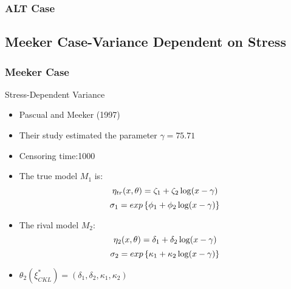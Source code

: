 \documentclass[xcolor=dvipsnames,aspectratio=1610]{beamer}
\begin{document}


\begin{frame}
\frametitle{ALT Case}

\begin{figure}
\end{figure}
\end{frame}



\subsection{Meeker Case-Variance Dependent on Stress}
\begin{frame}
\frametitle{Meeker Case}
Stress-Dependent Variance
\begin{itemize}
\item Pascual and Meeker (1997)

\item Their study estimated the parameter $\gamma=75.71$

\item Censoring time:1000

\item The true model $M_1$ is:
\begin{equation}\notag
\eta_{tr}(x,\theta)=\zeta_1+\zeta_2\log(x-\gamma)
\end{equation}
\begin{equation}\notag
\sigma_1=exp\left\{\phi_1+\phi_2\log(x-\gamma)\right\}
\end{equation}
\item The rival model $M_2$: 
\begin{equation}\notag
\eta_2(x,\theta)=\delta_1+\delta_2\log(x-\gamma)
\end{equation}
\begin{equation}\notag
\sigma_2=exp\left\{\kappa_1+\kappa_2\log(x-\gamma)\right\}
\end{equation}
\item $\theta_2(\xi^*_{CKL})=(\delta_1,\delta_2,\kappa_1,\kappa_2)$

\end{itemize}


\end{frame}
\end{document}
